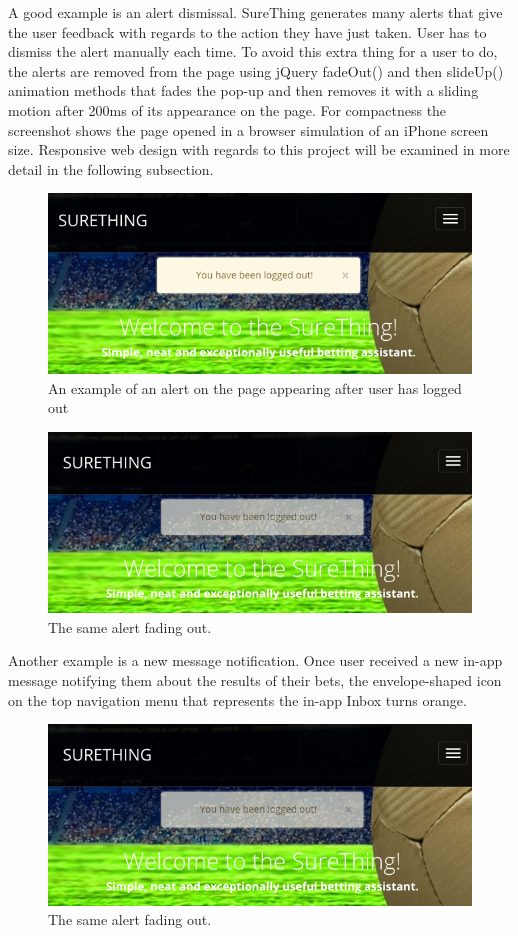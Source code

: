A good example is an alert dismissal. SureThing generates many alerts that give the user feedback with regards to the action they have just taken. User has to dismiss the alert manually each time. To avoid this extra thing for a user to do, the alerts are removed from the page using jQuery fadeOut() and then slideUp() animation methods that fades the pop-up and then removes it with a sliding motion after 200ms of its appearance on the page. For compactness the screenshot shows the page opened in a browser simulation of an iPhone screen size. Responsive web design with regards to this project will be examined in more detail in the following subsection.

\begin{figure}[H]
	\begin{center}
		\includegraphics[width=.60\linewidth,natwidth=610,natheight=642]{impl/images/alert}
		\caption{An example of an alert on the page appearing after user has logged out} \label{fig:alert}
	\end{center}
\end{figure}

\begin{figure}[H]
	\begin{center}
		\includegraphics[width=.60\linewidth,natwidth=610,natheight=642]{impl/images/alertFadeOut}
		\caption{The same alert fading out.} \label{fig:alertFadeOut}
	\end{center}
\end{figure}

Another example is a new message notification. Once user received a new in-app message notifying them about the results of their bets, the envelope-shaped icon on the top navigation menu that represents the in-app Inbox turns orange. 

\begin{figure}[H]
	\begin{center}
		\includegraphics[width=.60\linewidth,natwidth=610,natheight=642]{impl/images/alertFadeOut}
		\caption{The same alert fading out.} \label{fig:alertFadeOut}
	\end{center}
\end{figure}

